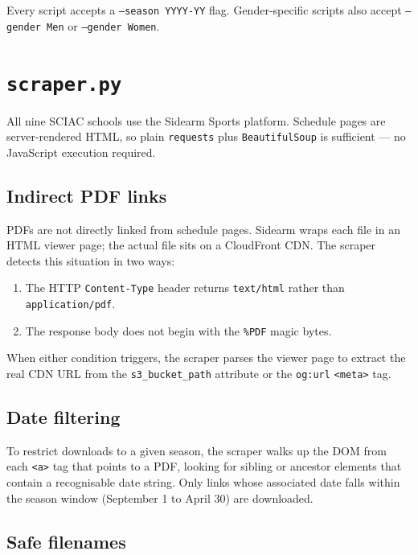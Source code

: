 \documentclass{article}
\begin{document}
Every script accepts a \texttt{--season YYYY-YY} flag. Gender-specific scripts
also accept \texttt{--gender Men} or \texttt{--gender Women}.

\section{\texttt{scraper.py}}

All nine SCIAC schools use the Sidearm Sports platform. Schedule pages are
server-rendered HTML, so plain \texttt{requests} plus \texttt{BeautifulSoup}
is sufficient --- no JavaScript execution required.

\subsection*{Indirect PDF links}

PDFs are not directly linked from schedule pages. Sidearm wraps each file in an
HTML viewer page; the actual file sits on a CloudFront CDN. The scraper detects
this situation in two ways:

\begin{enumerate}[noitemsep]
  \item The HTTP \texttt{Content-Type} header returns \texttt{text/html} rather
        than \texttt{application/pdf}.
  \item The response body does not begin with the \texttt{\%PDF} magic bytes.
\end{enumerate}

When either condition triggers, the scraper parses the viewer page to extract
the real CDN URL from the \texttt{s3\_bucket\_path} attribute or the
\texttt{og:url} \texttt{<meta>} tag.

\subsection*{Date filtering}

To restrict downloads to a given season, the scraper walks up the DOM from each
\texttt{<a>} tag that points to a PDF, looking for sibling or ancestor elements
that contain a recognisable date string. Only links whose associated date falls
within the season window (September 1 to April 30) are downloaded.

\subsection*{Safe filenames}
\end{document}
